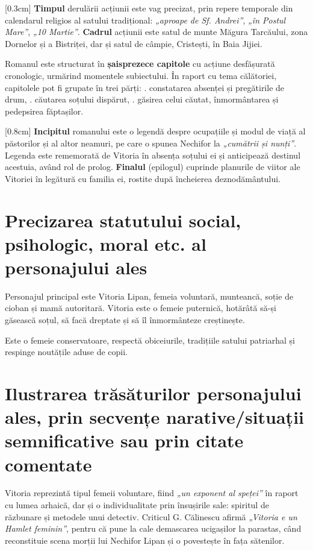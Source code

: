 \documentclass[
12pt,
a4paper
]{article}
\newcommand{\rom}[1]{\uppercase\expandafter{\romannumeral #1\relax}} %
\begin{document}
[0.3cm]
\textbf{Timpul} derulării acțiunii este vag precizat, prin repere temporale din calendarul religios al satului tradițional: \textit{„aproape de Sf. Andrei”}, \textit{„în Postul Mare”}, \textit{„10 Martie”}. \textbf{Cadrul} acțiunii este satul de munte Măgura Tarcăului, zona Dornelor și a Bistriței, dar și satul de câmpie, Cristești, în Baia Jijiei.

Romanul este structurat în \textbf{șaisprezece capitole} cu acțiune desfășurată cronologic, urmărind momentele subiectului. În raport cu tema călătoriei, capitolele pot fi grupate în trei părți: \rom{1}. constatarea absenței și pregătirile de drum, \rom{2}. căutarea soțului dispărut, \rom{3}. găsirea celui căutat, înmormântarea și pedepsirea făptașilor.

[0.8cm]
\textbf{Incipitul} romanului este o legendă despre ocupațiile și modul de viață al păstorilor și al altor neamuri, pe care o spunea Nechifor la \textit{„cumătrii și nunți”}. Legenda este rememorată de Vitoria în absența soțului ei și anticipează destinul acestuia, având rol de prolog. \textbf{Finalul} (epilogul) cuprinde planurile de viitor ale Vitoriei în legătură cu familia ei, rostite după încheierea deznodământului.

\section{Precizarea statutului social, psihologic, moral etc. al personajului ales}

Personajul principal este Vitoria Lipan, femeia voluntară, munteancă, soție de cioban și mamă autoritară. Vitoria este o femeie puternică, hotărâtă să-și găsească soțul, să facă dreptate și să îl înmormânteze creștinește.

Este o femeie conservatoare, respectă obiceiurile, tradițiile satului patriarhal și respinge noutățile aduse de copii.

\section{Ilustrarea trăsăturilor personajului ales, prin secvențe na\-ra\-ti\-ve/situații semnificative sau prin citate comentate}

Vitoria reprezintă tipul femeii voluntare, fiind \textit{„un exponent al speței”} în raport cu lumea arhaică, dar și o individualitate prin însușirile sale: spiritul de răzbunare și metodele unui detectiv. Criticul G. Călinescu afirmă \textit{„Vitoria e un Hamlet feminin”}, pentru că pune la cale demascarea ucigașilor la parastas, când reconstituie scena morții lui Nechifor Lipan și o povestește în fața sătenilor.
\end{document}
